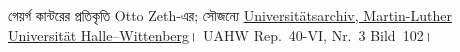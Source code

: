 গেয়র্গ কান্টরের প্রতিকৃতি Otto Zeth-এর; সৌজন্যে
\href{http://www.archiv.uni-halle.de/}{Universit\"atsarchiv,
Martin-Luther Universit\"at Halle--Wittenberg}।
UAHW Rep.~40-VI, Nr.~3 Bild~102।
